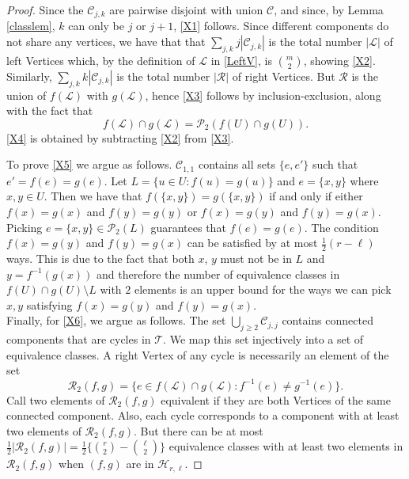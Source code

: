 \documentclass[reqno]{amsart}
\theoremstyle{theorem}
\theoremstyle{definition}
\theoremstyle{remark}
\def\PP{\mathscr{P}}
\def\LL{\mathscr{L}}
\def\RR{\mathscr{R}}
\def\TT{\mathscr{T}}
\def\CC{\mathscr{C}}
\def\HH{\mathscr{H}}
\newcommand{\1}{{\text{\Large $\mathfrak 1$}}}	%
\numberwithin{equation}{section}
\begin{document}
\begin{proof}
Since the $\CC_{j,k}$ are pairwise disjoint with union $\CC$, and since,
by Lemma \ref{classlem}, $k$ can only be $j$ or $j+1$,
\eqref{X1} follows.
Since different components do not share any vertices, we have that
that $\sum_{j,k} j |\CC_{j,k}|$  is the total number $|\LL|$ of left Vertices
which, by the definition of $\LL$ in \eqref{LeftV},
is $\binom{m}{2}$, showing \eqref{X2}.
Similarly, $\sum_{j,k} k |\CC_{j,k}|$ is the total number $|\RR|$ 
of right Vertices. But $\RR$ is the union of $f(\LL)$ with $g(\LL)$,
hence \eqref{X3} follows by inclusion-exclusion, along with the 
fact that 
\[
f(\LL) \cap g(\LL) = \PP_2(f(U)\cap g(U)).
\]
\eqref{X4} is obtained by subtracting \eqref{X2} from \eqref{X3}.


To prove \eqref{X5} we argue as follows.
$\CC_{1, 1}$ contains all sets $\{e, e'\}$ such that
$e' = f(e) = g(e)$. Let $L = \{u \in U : f(u) = g(u)\}$ and
$e = \{x, y\}$ where $x, y \in U$.
Then we have that $f(\{x, y\}) = g(\{x, y\})$ if and only if either
$f(x) = g(x)$ and $f(y) = g(y)$ or $f(x) =  g(y)$ and $f(y) = g(x)$.
Picking $e = \{x, y\} \in \PP_2(L)$ guarantees that $f(e) = g(e)$.
The condition $f(x) = g(y)$ and $f(y) = g(x)$ can be satisfied by
at most $\frac{1}{2} (r - \ell)$ ways. This is due to the fact that
both $x$, $y$ must not be in $L$ and $y = f^{-1}(g(x))$ and therefore
the number of equivalence classes in $f(U) \cap g(U) \setminus L$ with
$2$ elements is an upper bound for the ways we can pick $x, y$
satisfying $f(x) = g(y)$ and $f(y) = g(x)$.
\\
Finally, for \eqref{X6},
we argue as follows.
The set $\bigcup_{j \ge 2} \CC_{j,j}$ contains connected components
that are cycles in $\TT$.
We map this set injectively into a set of equivalence classes.
A right Vertex of any cycle is necessarily an element of the set
\[
\RR_2(f,g) 
= \{e \in f(\LL) \cap g(\LL): f^{-1}(e) \neq g^{-1}(e)\}.
\]
Call two elements of $\RR_2(f,g)$ equivalent if they are both
Vertices of the same connected component. Also, each cycle corresponds
to a component with at least two elements of $\RR_2(f,g)$. 
But there can be at most
$\frac12 |\RR_2(f, g)| = \frac12 \{\binom{r}{2} - \binom{\ell}{2}\}$ equivalence
classes with at least two elements in $\RR_2(f, g)$ when $(f, g)$ are in
$\HH_{r, \ell}$.
\end{proof}
\end{document}
